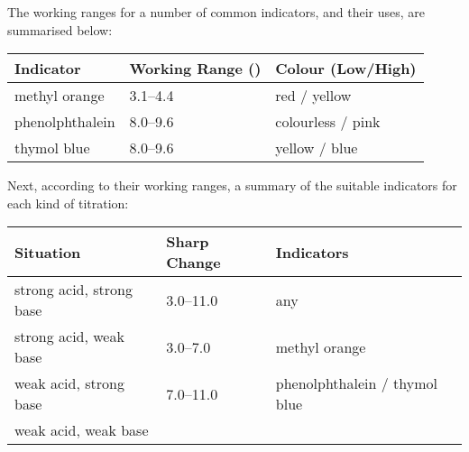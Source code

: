 			The working \pH{} ranges for a number of common indicators, and their uses, are summarised below:


			\begin{table}[htb]\renewcommand{\arraystretch}{1.5}\begin{center}
			\begin{tabu} to 0.8\textwidth { X[c,m] | X[c,m] | X[c,m] }

				Indicator       &   Working Range (\pH{})   &   Colour (Low/High)   \\ \hline

				methyl orange   &   \numrange{3.1}{4.4}     &   red / yellow        \\
				phenolphthalein &   \numrange{8.0}{9.6}     &   colourless / pink   \\
				thymol blue     &   \numrange{8.0}{9.6}     &   yellow / blue       \\


			\end{tabu}\end{center}
			\end{table} %

			Next, according to their working \pH{} ranges, a summary of the suitable indicators for each kind of titration:


			\begin{table}[htb]\renewcommand{\arraystretch}{1.5}\begin{center}
			\begin{tabu} to 0.9\textwidth { X[2,c,m] | X[1.2,c,m] | X[2,c,m] }

				Situation                   &   Sharp \pH{} Change      &   Indicators                      \\	\hline

				strong acid, strong base    &   \numrange{3.0}{11.0}    &   any                             \\
				strong acid, weak base      &   \numrange{3.0}{7.0}     &   methyl orange                   \\
				weak acid, strong base      &   \numrange{7.0}{11.0}    &   phenolphthalein / thymol blue   \\
				weak acid, weak base        &                 &                         \\


			\end{tabu}\end{center}
			\end{table}\vspace{-1em}


































